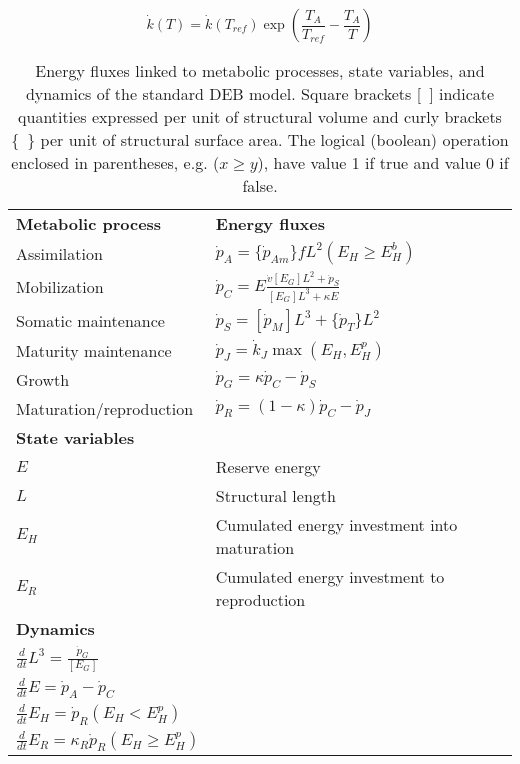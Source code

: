 \documentclass{article}
\begin{document}
\begin{equation}
    \dot{k}(T) = \dot{k}(T_{ref}) \exp \left( \frac{T_A}{T_{ref}}-\frac{T_A}{T} \right)
\end{equation}
\begin{table}
	\caption{Energy fluxes linked to metabolic processes, state variables, and dynamics of the standard DEB model. Square brackets {[}~{]} indicate quantities expressed per unit of structural volume and curly brackets \{~\} per unit of structural surface area. The logical (boolean) operation enclosed in parentheses, e.g. ($x \ge y$), have value 1 if true and value 0 if false.}
	\centering
	\begin{tabular}{ll}
	\\[1ex]
		\hline\hline
		\textbf{Metabolic process} & \textbf{Energy fluxes}\\
		Assimilation & $  \dot{p}_A= \{\dot{p}_{Am} \}fL^2(E_H \ge E_H^b) $\\[1ex]
	        Mobilization & $ \dot{p}_C = E \frac{\dot{v} [E_G] L^2+\dot{p}_S}{[E_G] L^3+\kappa E} $\\[2ex]
		Somatic maintenance 	& $ \dot{p}_S= {[\dot{p}_M]}L^3 + \{\dot{p}_T\} L^2 $\\
		Maturity maintenance & $ \dot{p}_J	= \dot{k}_J \max( E_H,E_H^p) $\\
		Growth & $ \dot{p}_G = \kappa\dot{p}_C-\dot{p}_S$\\
		Maturation/reproduction & $ \dot{p}_R = (1-\kappa)\dot{p}_C-\dot{p}_J $\\[1ex]
		\textbf{State variables}& \\
		$ E$	&Reserve energy\\
	    $ L$	&Structural length\\
		$ E_H$	&Cumulated energy investment into maturation\\
		$ E_R$	&Cumulated energy investment to reproduction\\[1ex]
		\textbf{Dynamics}& \\
		$ \frac{d}{dt}L^3=\frac{\dot{p}_G}{[E_G]} $&\\
		$ \frac{d}{dt}E=\dot{p}_A-\dot{p}_C $&\\
		$ \frac{d}{dt}E_H=\dot{p}_R(E_H<E_H^p) $&\\
		$ \frac{d}{dt}E_R=\kappa_R \dot{p}_R(E_H \ge E_H^p) $&\\[1ex]
		\hline\hline
	\end{tabular}
	\label{tab:DEB_model}
\end{table}
\end{document}
